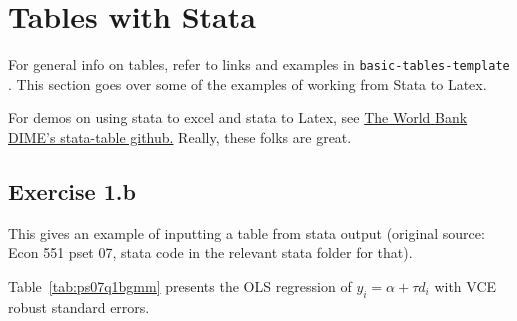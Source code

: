 \section{Tables with Stata}\label{stata_tables}

For general info on tables, refer to links and examples in \verb+basic-tables-template+ . This section goes over some of the examples of working from Stata to Latex.

For demos on using stata to excel and stata to Latex, see \href{https://github.com/worldbank/stata-tables}{The World Bank DIME's stata-table github.} Really, these folks are great.


\subsection{Exercise 1.b}
This gives an example of inputting a table from stata output (original source: Econ 551 pset 07, stata code in the relevant stata folder for that).

Table~\ref{tab:ps07q1bgmm} presents the  OLS regression of $y_i = \alpha +\tau d_i$ with VCE robust standard errors.

